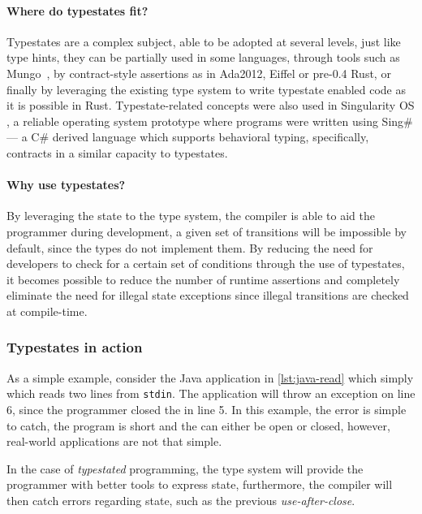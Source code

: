 \paragraph{Where do typestates fit?}
Typestates are a complex subject, able to be adopted at several levels,
just like type hints, they can be partially used in some languages,
through tools such as Mungo~\autocite{Voinea2020}, by contract-style assertions as in Ada2012, Eiffel or pre-0.4 Rust,
or finally by leveraging the existing type system to write typestate enabled code as it is possible in Rust.
Typestate-related concepts were also used in Singularity OS \autocite[Section 6]{Ancona2016},
a reliable operating system prototype where programs were written using Sing\# --- a C\# derived language which supports behavioral typing,
specifically, contracts in a similar capacity to typestates.

\paragraph{Why use typestates?}
By leveraging the state to the type system, the compiler is able to aid the programmer during development,
a given set of transitions will be impossible by default, since the types do not implement them.
By reducing the need for developers to check for a certain set of conditions through the use of typestates,
it becomes possible to reduce the number of runtime assertions and
completely eliminate the need for illegal state exceptions since illegal transitions are checked at compile-time.


\subsubsection*{Typestates in action}

As a simple example, consider the Java application in \autoref{lst:java-read} which simply which reads two lines from \texttt{stdin}.
The application will throw an exception on line 6,
since the programmer closed the  in line 5.
In this example, the error is simple to catch,
the program is short and the  can either be open or closed,
however, real-world applications are not that simple.



In the case of \emph{typestated} programming,
the type system will provide the programmer with better tools to express state,
furthermore, the compiler will then catch errors regarding state,
such as the previous \emph{use-after-close}.

